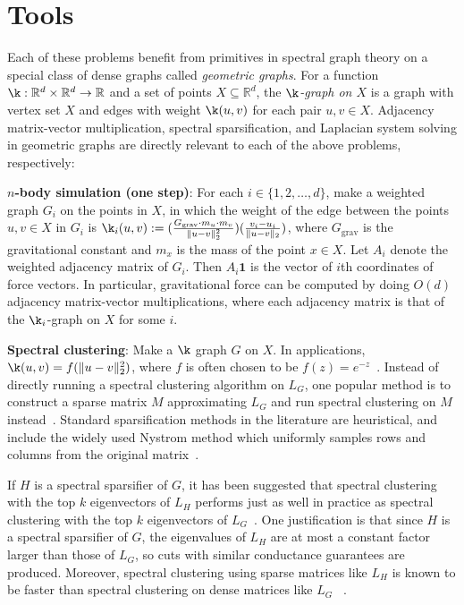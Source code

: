 \section{Tools}

Each of these problems benefit from primitives in
spectral graph theory on a special class of dense graphs called
\emph{geometric graphs}. For a function $\k:\mathbb{R}^d\times
\mathbb{R}^d\rightarrow \mathbb{R}$ and a set of points $X\subseteq
\mathbb{R}^d$, the \emph{$\k$-graph on $X$} is a graph with vertex set
$X$ and edges with weight $\k(u,v)$ for each pair $u,v\in X$. Adjacency
matrix-vector multiplication, spectral sparsification, and Laplacian
system solving in geometric graphs are directly relevant to each of the
above problems, respectively:

\vspace{1mm} \begin{tight_enumerate} \item \textbf{$n$-body simulation (one
    step)}: For each $i\in \{1,2,\hdots,d\}$, make a weighted graph
$G_i$ on the points in $X$, in which the weight of the edge between the
points $u,v\in X$ in $G_i$ is $\k_i(u,v) := (\frac{G_{\text{grav}} \cdot
    m_u \cdot m_v}{\|u - v\|_2^2})(\frac{v_i - u_i}{\|u - v\|_2})$,
       where $G_{\text{grav}}$ is the gravitational constant and $m_x$
       is the mass of the point $x\in X$. Let $A_i$ denote the weighted
       adjacency matrix of $G_i$. Then $A_i\textbf{1}$ is the vector of
       $i$th coordinates of force vectors. In particular, gravitational
       force can be computed by doing $O(d)$ adjacency matrix-vector
       multiplications, where each adjacency matrix is that of the
       $\k_i$-graph on $X$ for some $i$.

\item \textbf{Spectral clustering}: Make a $\k$ graph $G$ on $X$. In
applications, $\k(u,v) = f(\|u-v\|_2^2)$, where $f$ is often chosen to
be $f(z) = e^{-z}$~\cite{l07,njw02}. Instead of directly running a
spectral clustering algorithm on $L_G$, one popular method is to
construct a sparse matrix $M$ approximating $L_G$ and run spectral
clustering on $M$ instead~\cite{chl16,csblc11, kmt12}. Standard
sparsification methods in the literature are heuristical, and include
the widely used Nystrom method which uniformly samples rows and columns
from the original matrix~\cite{cjkmm13}. 

If $H$ is a spectral sparsifier of $G$, it has been suggested that
spectral clustering with the top $k$ eigenvectors of $L_H$ performs just
as well in practice as spectral clustering with the top $k$ eigenvectors
of $L_G$~\cite{chl16}.  One justification is that since $H$ is a
spectral sparsifier of $G$, the eigenvalues of $L_H$ are at most a
constant factor larger than those of $L_G$, so cuts with similar
conductance guarantees are produced. Moreover, spectral clustering using
sparse matrices like $L_H$ is known to be faster than spectral
clustering on dense matrices like $L_G$ ~\cite{chl16, cjkmm13, kmt12}.


\end{tight_enumerate}
